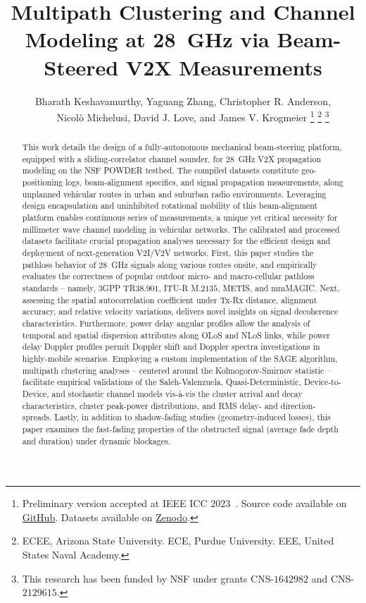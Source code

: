 \documentclass[12pt, draftcls, onecolumn]{IEEEtran}
\title{Multipath Clustering and Channel Modeling at \SI{28}{\giga\hertz} via Beam-Steered V2X Measurements}
\author{Bharath Keshavamurthy\IEEEauthorrefmark{1}, Yaguang Zhang\IEEEauthorrefmark{2}, Christopher R. Anderson\IEEEauthorrefmark{3},\\\ \ \ \ Nicol\`{o} Michelusi\IEEEauthorrefmark{1}, David J. Love\IEEEauthorrefmark{2}, and James V. Krogmeier\IEEEauthorrefmark{2}
\thanks{Preliminary version accepted at IEEE ICC $2023$~\cite{ICC}. Source code available on \href{https://github.com/bharathkeshavamurthy/SPAVE-28G.git}{GitHub}\cite{SPAVE-28G-Software}. Datasets available on \href{https://doi.org/10.5281/zenodo.7178597}{Zenodo}\cite{SPAVE-28G-Dataset}.}
\thanks{\IEEEauthorrefmark{1}ECEE, Arizona State University. \IEEEauthorrefmark{2}ECE, Purdue University. \IEEEauthorrefmark{3}EEE, United States Naval Academy.}
\thanks{This research has been funded by NSF under grants CNS-$1642982$ and CNS-$2129615$.}
\vspace{-8mm}
}
\begin{document}

\maketitle
\thispagestyle{plain}
\pagestyle{plain}
\vspace{-8mm}

\begin{abstract}
This work details the design of a fully-autonomous mechanical beam-steering platform, equipped with a sliding-correlator channel sounder, for \SI{28}{\giga\hertz} V2X propagation modeling on the NSF POWDER testbed. The compiled datasets constitute geo-positioning logs, beam-alignment specifics, and signal propagation measurements, along unplanned vehicular routes in urban and suburban radio environments. Leveraging design encapsulation and uninhibited rotational mobility of this beam-alignment platform enables continuous series of measurements, a unique yet critical necessity for millimeter wave channel modeling in vehicular networks. The calibrated and processed datasets facilitate crucial propagation analyses necessary for the efficient design and deployment of next-generation V$2$I/V$2$V networks. First, this paper studies the pathloss behavior of \SI{28}{\giga\hertz} signals along various routes onsite, and empirically evaluates the correctness of popular outdoor micro- and macro-cellular pathloss standards -- namely, $3$GPP TR$38.901$, ITU-R M$.2135$, METIS, and mmMAGIC. Next, assessing the spatial autocorrelation coefficient under Tx-Rx distance, alignment accuracy, and relative velocity variations, delivers novel insights on signal decoherence characteristics. Furthermore, power delay angular profiles allow the analysis of temporal and spatial dispersion attributes along OLoS and NLoS links, while power delay Doppler profiles permit Doppler shift and Doppler spectra investigations in highly-mobile scenarios. Employing a custom implementation of the SAGE algorithm, multipath clustering analyses -- centered around the Kolmogorov-Smirnov statistic -- facilitate empirical validations of the Saleh-Valenzuela, Quasi-Deterministic, Device-to-Device, and stochastic channel models vis-\`{a}-vis the cluster arrival and decay characteristics, cluster peak-power distributions, and RMS delay- and direction-spreads. Lastly, in addition to shadow-fading studies (geometry-induced losses), this paper examines the fast-fading properties of the obstructed signal (average fade depth and duration) under dynamic blockages.
\end{abstract}
\vspace{-4mm}
\end{document}
